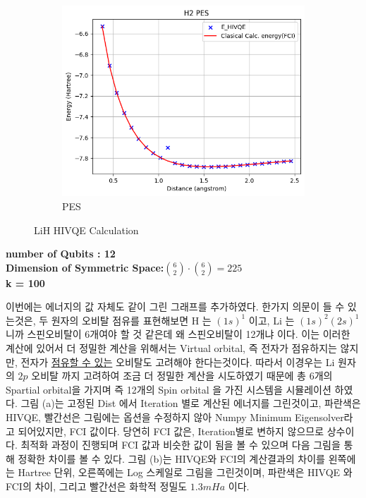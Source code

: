 \documentclass[11pt]{article}
\begin{document}
\begin{figure}[H]
\begin{subfigure}[b]{0.25\textwidth}
    \includegraphics[width=\textwidth]{fig/LiH_PES.png}
    \caption{PES}
    \label{fig:second}
  \end{subfigure} 
  \caption{LiH HIVQE Calculation}
  \label{fig:two_figures_side_by_side}
\end{figure}
\begin{center}
\textbf{number of Qubits : 12}\\
\textbf{Dimension of Symmetric Space:\(\binom{6}{2}\cdot\binom{6}{2}=225\)}\\
\textbf{k = 100}
\end{center}
이번에는 에너지의 값 자체도 같이 그린 그래프를 추가하였다.
한가지 의문이 들 수 있는것은, 두 원자의 오비탈 점유를 표현해보면 H 는 \((1s)^{1}\) 이고, Li 는 \((1s)^{2}(2s)^{1}\) 니까 스핀오비탈이 6개여야 할 것 같은데 왜 스핀오비탈이 12개냐 이다.
이는 이러한 계산에 있어서 더 정밀한 계산을 위해서는 Virtual orbital, 즉 전자가 점유하지는 않지만, 전자가 \underline{점유할 수 있는} 오비탈도 고려해야 한다는것이다. 따라서 이경우는 Li 원자의 \(2p\) 오비탈 까지 고려하여 
조금 더 정밀한 계산을 시도하였기 때문에 총 6개의 Spartial orbital을 가지며 즉 12개의 Spin orbital 을 가진 시스템을 시뮬레이션 하였다. 
그림 (a)는 고정된 Dist 에서 Iteration 별로 계산된 에너지를 그린것이고, 파란색은 HIVQE, 빨간선은 그림에는 옵션을 수정하지 않아 Numpy Minimum Eigensolver라고 되어있지만, FCI 값이다. 
당연히 FCI 값은, Iteration별로 변하지 않으므로 상수이다. 최적화 과정이 진행되며 FCI 값과 비슷한 값이 됨을 볼 수 있으며 다음 그림을 통해 정확한 차이를 볼 수 있다. 
그림 (b)는 HIVQE와 FCI의 계산결과의 차이를 왼쪽에는 Hartree 단위, 오른쪽에는 Log 스케일로 그림을 그린것이며, 파란색은 HIVQE 와 FCI의 차이, 그리고 빨간선은 화학적 정밀도 \(1.3mHa\) 이다. 
\end{document}
